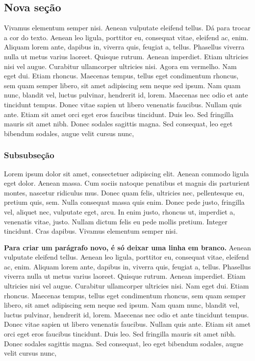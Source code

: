 \documentclass[pdftex,12pt,a4paper]{article} %
\begin{document}
\subsection{Nova seção}

Vivamus elementum semper nisi. Aenean vulputate eleifend
tellus. {\color{blue}Dá para trocar a cor do texto.} Aenean leo
ligula, porttitor eu, consequat vitae, eleifend ac, enim. Aliquam
lorem ante, dapibus in, viverra quis, feugiat a, tellus. Phasellus
viverra nulla ut metus varius laoreet. Quisque rutrum. Aenean
imperdiet. Etiam ultricies nisi vel augue. Curabitur ullamcorper
ultricies nisi. {\color{red} Agora em vermelho.} Nam eget dui. Etiam
rhoncus. Maecenas tempus, tellus eget condimentum rhoncus, sem quam
semper libero, sit amet adipiscing sem neque sed ipsum. Nam quam nunc,
blandit vel, luctus pulvinar, hendrerit id, lorem. Maecenas nec odio
et ante tincidunt tempus. Donec vitae sapien ut libero venenatis
faucibus. Nullam quis ante. Etiam sit amet orci eget eros faucibus
tincidunt. Duis leo. Sed fringilla mauris sit amet nibh. Donec sodales
sagittis magna. Sed consequat, leo eget bibendum sodales, augue velit
cursus nunc,

\subsubsection{Subsubseção}

Lorem ipsum dolor sit amet, consectetuer adipiscing elit. Aenean
commodo ligula eget dolor. Aenean massa. Cum sociis natoque penatibus
et magnis dis parturient montes, nascetur ridiculus mus. Donec quam
felis, ultricies nec, pellentesque eu, pretium quis, sem. Nulla
consequat massa quis enim. Donec pede justo, fringilla vel, aliquet
nec, vulputate eget, arcu. In enim justo, rhoncus ut, imperdiet a,
venenatis vitae, justo. Nullam dictum felis eu pede mollis
pretium. Integer tincidunt. Cras dapibus. Vivamus elementum semper
nisi.

{\bf Para criar um parágrafo novo, é só deixar uma linha em branco.}
Aenean vulputate eleifend tellus. Aenean leo ligula, porttitor eu,
consequat vitae, eleifend ac, enim. Aliquam lorem ante, dapibus in,
viverra quis, feugiat a, tellus. Phasellus viverra nulla ut metus
varius laoreet. Quisque rutrum. Aenean imperdiet. Etiam ultricies nisi
vel augue. Curabitur ullamcorper ultricies nisi. Nam eget dui. Etiam
rhoncus. Maecenas tempus, tellus eget condimentum rhoncus, sem quam
semper libero, sit amet adipiscing sem neque sed ipsum. Nam quam nunc,
blandit vel, luctus pulvinar, hendrerit id, lorem. Maecenas nec odio
et ante tincidunt tempus. Donec vitae sapien ut libero venenatis
faucibus. Nullam quis ante. Etiam sit amet orci eget eros faucibus
tincidunt. Duis leo. Sed fringilla mauris sit amet nibh. Donec sodales
sagittis magna. Sed consequat, leo eget bibendum sodales, augue velit
cursus nunc,
\end{document}
